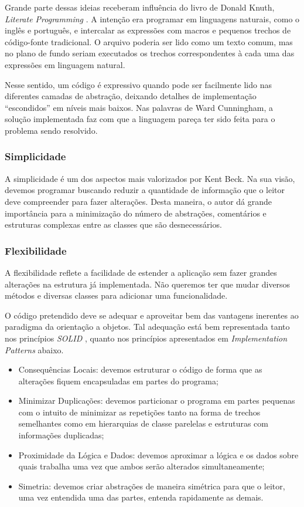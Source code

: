 Grande parte dessas ideias receberam influência do livro de Donald Knuth, \textit{Literate Programming} \citep{Knuth92}. A intenção era programar em linguagens naturais, como o inglês e português, e intercalar as expressões com macros e pequenos trechos de código-fonte tradicional. O arquivo poderia ser lido como um texto comum, mas no plano de fundo seriam executados os trechos correspondentes à cada uma das expressões em linguagem natural.

Nesse sentido, um código é expressivo quando pode ser facilmente lido nas diferentes camadas de abstração, deixando detalhes de implementação ``escondidos'' em níveis mais baixos. Nas palavras de Ward Cunningham, a solução implementada faz com que a linguagem pareça ter sido feita para o problema sendo resolvido.

\subsubsection{Simplicidade}
A simplicidade é um dos aspectos mais valorizados por Kent Beck. Na sua visão, devemos programar buscando reduzir a quantidade de informação que o leitor deve compreender para fazer alterações. Desta maneira, o autor dá grande importância para a minimização do número de abstrações, comentários e estruturas complexas entre as classes que são desnecessários.

\subsubsection{Flexibilidade}
A flexibilidade reflete a facilidade de estender a aplicação sem fazer grandes alterações na estrutura já implementada. Não queremos ter que mudar diversos métodos e diversas classes para adicionar uma funcionalidade.

O código pretendido deve se adequar e aproveitar bem das vantagens inerentes ao paradigma da orientação a objetos. Tal adequação está bem representada tanto nos princípios \textit{SOLID} \citep{Martin2000}, quanto nos princípios apresentados em \textit{Implementation Patterns} abaixo.

\begin{itemize}
	\item Consequências Locais: devemos estruturar o código de forma que as alterações fiquem encapsuladas em partes do programa;
	\item Minimizar Duplicações: devemos particionar o programa em partes pequenas com o intuito de minimizar as repetições tanto na forma de trechos semelhantes como em hierarquias de classe parelelas e estruturas com informações duplicadas;
	\item Proximidade da Lógica e Dados: devemos aproximar a lógica e os dados sobre quais trabalha uma vez que ambos serão alterados simultaneamente;
	\item Simetria: devemos criar abstrações de maneira simétrica para que o leitor, uma vez entendida uma das partes, entenda rapidamente as demais.
\end{itemize}

